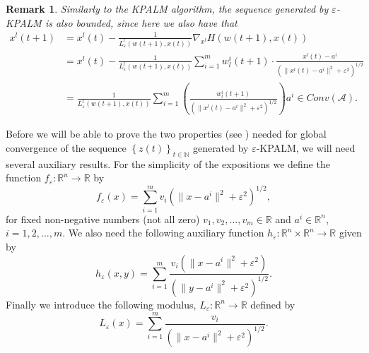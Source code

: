 \documentclass[12pt]{article}
\numberwithin{equation}{section}
\newtheorem{remark}{Remark}
\begin{document}
\begin{remark}
Similarly to the KPALM algorithm, the sequence generated by $\varepsilon$-KPALM is also bounded, since here we also have that
\begin{align*}
	x^l(t+1) &= x^l(t) - \frac{1}{L^l_{\varepsilon}(w(t+1),x(t))} \nabla_{x^l} H(w(t+1),x(t)) \\
	&= x^l(t) - \frac{1}{L^l_{\varepsilon}(w(t+1),x(t))} \sum\limits_{i=1}^{m} w^i_l(t+1) \cdot \frac{x^l(t) - a^i}{\left( \|x^l(t) - a^i\|^2 + {\varepsilon}^2 \right)^{1/2}} \\
	&= \frac{1}{L^l_{\varepsilon}(w(t+1),x(t))} \sum\limits_{i=1}^{m} \left( \frac{w^i_l(t+1)}{\left( \|x^l(t) - a^i\|^2 + {\varepsilon}^2 \right)^{1/2}} \right) a^i \in Conv(\mathcal{A}).
\end{align*}
\end{remark}

Before we will be able to prove the two properties (see ) needed for global convergence of the sequence $\left\lbrace z(t) \right\rbrace_{t \in \mathbb{N}}$ generated by $\varepsilon$-KPALM, we will need several auxiliary results. For the simplicity of the expositions we define the  function $f_{\varepsilon}: \mathbb{R}^n \rightarrow \mathbb{R}$ by
\begin{equation*}
	f_{\varepsilon}(x) = \sum\limits_{i=1}^{m} v_i \left( \|x - a^i\|^2 + {\varepsilon}^2 \right)^{1/2},
\end{equation*}
for fixed non-negative numbers (not all zero) $v_1,v_2, \ldots, v_m \in \mathbb{R}$ and $a^i \in \mathbb{R}^n$, $i=1,2, \ldots, m$. We also need the following auxiliary function $h_{\varepsilon}: \mathbb{R}^n \times \mathbb{R}^n \rightarrow \mathbb{R}$ given by
\begin{equation*}
	h_{\varepsilon}(x,y) = \sum\limits_{i=1}^m \frac{v_i \left( \|x-a^i\|^2 + {\varepsilon}^2 \right)}{\left( \|y-a^i\|^2 + {\varepsilon}^2 \right)^{1/2}} .
\end{equation*}
Finally we introduce the following modulus, $L_{\varepsilon}: \mathbb{R}^n \rightarrow \mathbb{R}$ defined by
\begin{equation*}
	L_{\varepsilon}(x) = \sum\limits_{i=1}^{m}\frac{v_i}{\left( \|x - a^i\|^2 + {\varepsilon}^2 \right)^{1/2}} .
\end{equation*}
\end{document}
